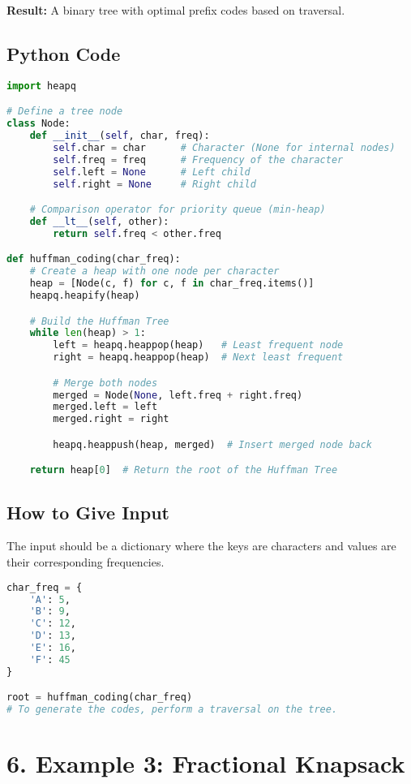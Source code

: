 \documentclass[14pt]{extarticle}
\begin{document}
\textbf{Result:} A binary tree with optimal prefix codes based on traversal.


\newpage
\subsection*{Python Code}
\begin{lstlisting}[language=Python]
import heapq

# Define a tree node
class Node:
    def __init__(self, char, freq):
        self.char = char      # Character (None for internal nodes)
        self.freq = freq      # Frequency of the character
        self.left = None      # Left child
        self.right = None     # Right child

    # Comparison operator for priority queue (min-heap)
    def __lt__(self, other):
        return self.freq < other.freq

def huffman_coding(char_freq):
    # Create a heap with one node per character
    heap = [Node(c, f) for c, f in char_freq.items()]
    heapq.heapify(heap)

    # Build the Huffman Tree
    while len(heap) > 1:
        left = heapq.heappop(heap)   # Least frequent node
        right = heapq.heappop(heap)  # Next least frequent

        # Merge both nodes
        merged = Node(None, left.freq + right.freq)
        merged.left = left
        merged.right = right

        heapq.heappush(heap, merged)  # Insert merged node back

    return heap[0]  # Return the root of the Huffman Tree
\end{lstlisting}

\newpage
\subsection*{How to Give Input}

The input should be a dictionary where the keys are characters and values are their corresponding frequencies.

\begin{lstlisting}[language=Python]
char_freq = {
    'A': 5,
    'B': 9,
    'C': 12,
    'D': 13,
    'E': 16,
    'F': 45
}

root = huffman_coding(char_freq)
# To generate the codes, perform a traversal on the tree.
\end{lstlisting}


\section*{6. Example 3: Fractional Knapsack}
\end{document}
